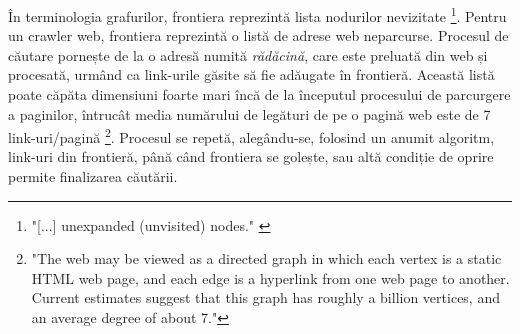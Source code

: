 În terminologia grafurilor, frontiera reprezintă lista nodurilor nevizitate \footnote{"[...] unexpanded (unvisited) nodes." \cite{PantSrinivasanMenczer} }. Pentru un crawler web, frontiera reprezintă o listă de adrese web neparcurse. Procesul de căutare pornește de la o adresă numită \textit{rădăcină}, care este preluată din web și procesată, urmând ca link-urile găsite să fie adăugate în frontieră. Această listă poate căpăta dimensiuni foarte mari încă de la începutul procesului de parcurgere a paginilor, întrucât media numărului de legături de pe o pagină web este de 7 link-uri/pagină \footnote{"The web  may  be  viewed  as  a  directed  graph  in  which each vertex is a static HTML web page, and each edge is a hyperlink from one web page to another. Current estimates suggest that this graph has roughly a billion vertices, and an average degree of about 7."\cite{StochasticModels}}. Procesul se repetă, alegându-se, folosind un anumit algoritm, link-uri din frontieră, până când frontiera se golește, sau altă condiție de oprire permite finalizarea căutării.
\\